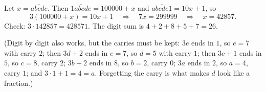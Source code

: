 Let $x=\overline{abcde}$. Then $\overline{1abcde}=100000+x$ and $\overline{abcde1}=10x+1$, so
\[
3(100000+x)=10x+1\quad\Longrightarrow\quad 7x=299999\quad\Longrightarrow\quad x=42857 .
\]
Check: $3\cdot142857=428571$. The digit sum is $4+2+8+5+7=\boxed{26}$.

(Digit by digit also works, but the carries must be kept: $3e$ ends in $1$, so $e=7$ with carry $2$; then $3d+2$ ends in $e=7$, so $d=5$ with carry $1$; then $3c+1$ ends in $5$, so $c=8$, carry $2$; $3b+2$ ends in $8$, so $b=2$, carry $0$; $3a$ ends in $2$, so $a=4$, carry $1$; and $3\cdot1+1=4=a$. Forgetting the carry is what makes $d$ look like a fraction.)
